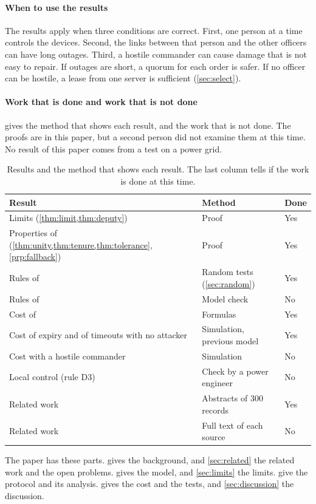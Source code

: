 \paragraph{When to use the results}
The results apply when three conditions are correct. First, one person at a time controls
the devices. Second, the links between that person and the other officers can
have long outages. Third, a hostile commander can cause damage that is not easy to repair.
If outages are short, a quorum for each order is safer. If no officer can be hostile, a
lease from one server is sufficient (\cref{sec:select}).

\paragraph{Work that is done and work that is not done}
 gives the method that shows each result, and the work that is not done.
The proofs are in this paper, but a second person did not examine them at this time. No
result of this paper comes from a test on a power grid.

\begin{table}[t]
\caption{Results and the method that shows each result. The last column tells if the work
is done at this time.}
\label{tab:status}
\centering
\small
\begin{tabularx}{\columnwidth}{@{}>{\raggedright\arraybackslash}X>{\raggedright\arraybackslash}p{}l@{}}
\toprule
Result & Method & Done \\
\midrule
Limits (\cref{thm:limit,thm:deputy}) & Proof & Yes \\
Properties of \sys{} (\cref{thm:unity,thm:tenure,thm:tolerance}, \cref{prp:fallback}) & Proof & Yes \\
Rules of \sys{} & Random tests (\cref{sec:random}) & Yes \\
Rules of \sys{} & Model check & No \\
Cost of \sys{} & Formulas & Yes \\
Cost of expiry and of timeouts with no attacker & Simulation, previous model & Yes \\
Cost with a hostile commander & Simulation & No \\
Local control (rule D3) & Check by a power engineer & No \\
Related work & Abstracts of 300 records & Yes \\
Related work & Full text of each source & No \\
\bottomrule
\end{tabularx}
\end{table}

The paper has these parts.  gives the background, and
\cref{sec:related} the related work and the open problems.  gives the model,
and \cref{sec:limits} the limits.  give the protocol and
its analysis.  gives the cost and the tests, and \cref{sec:discussion} the
discussion.
